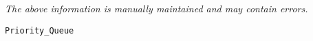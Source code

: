 \label{pkg:leftist\_tree\_priority\_queue}

{\tiny \it The above information is manually maintained and may contain errors.}
\begin{verbatim}
Priority_Queue
\end{verbatim}

